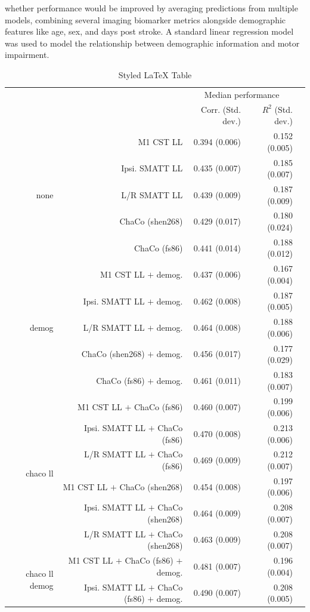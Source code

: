 \documentclass[10pt]{article}
\def\Plus{\texttt{+}}
\begin{document}
whether performance would be improved by averaging predictions from multiple models, combining several imaging biomarker metrics alongside demographic features like age, sex, and days post stroke. A standard linear regression model was used to model the relationship between demographic information and motor impairment. 
\begin{table}[h]
\centering
\caption{Styled LaTeX Table}
\label{table:5}
\begin{tabular}{rrrrr}
\toprule
 &  & \multicolumn{2}{c}{Median performance} \\
 &  & Corr. (Std. dev.) & $R^2$ (Std. dev.) \\
\midrule
\multirow[t]{5}{*}{none} & M1 CST LL & 0.394 (0.006) & 0.152 (0.005) \\
 & Ipsi. SMATT LL & 0.435 (0.007) & 0.185 (0.007) \\
 & L/R SMATT LL & 0.439 (0.009) & 0.187 (0.009) \\
 & ChaCo (shen268) & 0.429 (0.017) & 0.180 (0.024) \\
 & ChaCo (fs86) & 0.441 (0.014) & 0.188 (0.012) \\
\multirow[t]{5}{*}{demog} & M1 CST LL $\Plus$ demog. & 0.437 (0.006) & 0.167 (0.004) \\
 & Ipsi. SMATT LL $\Plus$ demog. & 0.462 (0.008) & 0.187 (0.005) \\
 & L/R SMATT LL $\Plus$ demog. & 0.464 (0.008) & 0.188 (0.006) \\
 & ChaCo (shen268) $\Plus$ demog. & 0.456 (0.017) & 0.177 (0.029) \\
 & ChaCo (fs86) $\Plus$ demog. & 0.461 (0.011) & 0.183 (0.007) \\
\multirow[t]{6}{*}{chaco ll} & M1 CST LL $\Plus$ ChaCo (fs86) & 0.460 (0.007) & 0.199 (0.006) \\
 & Ipsi. SMATT LL $\Plus$ ChaCo (fs86) & 0.470 (0.008) & 0.213 (0.006) \\
 & L/R SMATT LL $\Plus$ ChaCo (fs86) & 0.469 (0.009) & 0.212 (0.007) \\
 & M1 CST LL $\Plus$ ChaCo (shen268) & 0.454 (0.008) & 0.197 (0.006) \\
 & Ipsi. SMATT LL $\Plus$ ChaCo (shen268) & 0.464 (0.009) & 0.208 (0.007) \\
 & L/R SMATT LL $\Plus$ ChaCo (shen268) & 0.463 (0.009) & 0.208 (0.007) \\
\multirow[t]{6}{*}{chaco ll demog} & M1 CST LL $\Plus$ ChaCo  (fs86) $\Plus$ demog. & 0.481 (0.007) & 0.196 (0.004) \\
 & Ipsi. SMATT LL $\Plus$ ChaCo  (fs86) $\Plus$ demog. & 0.490 (0.007) & 0.208 (0.005) \\

\end{tabular}
\end{table}
\end{document}
